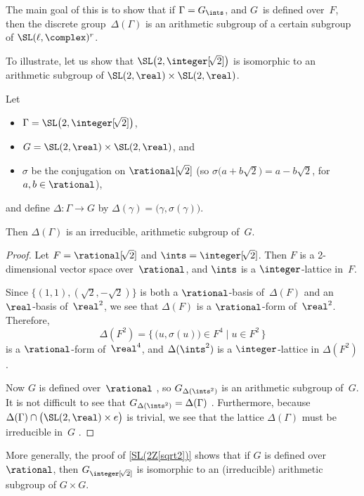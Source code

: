 The main goal of this  is to show that if $\Gamma = G_{\ints}$, and $G$~is defined
over~$F$, then the discrete group~$\Delta(\Gamma)$ is an arithmetic subgroup of a certain subgroup of
$\SL(\ell,\complex)^r$.

To illustrate, let us show that
$\SL \bigl( 2,\integer[\!\sqrt{2}] \bigr)$ is isomorphic to an
arithmetic subgroup of $\SL(2,\real) \times
\SL(2,\real)$.

\begin{eg} \label{SL(2Z[sqrt2])}
 Let
 \noprelistbreak
 \begin{itemize}
 \item $\Gamma = \SL \bigl( 2,\integer[\!\sqrt{2}] \bigr)$,
 \item $G = \SL(2, \real) \times \SL(2, \real)$, and
 \item $\sigma$ be the conjugation on $\rational[\!\sqrt{2}]$
\textup(so $\sigma \bigl( a + b \sqrt{2} \bigr) = a - b
\sqrt{2}$, for $a,b \in \rational$\textup),
 \end{itemize}
 and define $\Delta \colon \Gamma \to G$ by
$\Delta(\gamma) = \bigl(\gamma, \sigma(\gamma) \bigr)$.

Then $\Delta(\Gamma)$ is an irreducible, arithmetic subgroup
of~$G$.
 \end{eg}

\begin{proof}
 Let $F = \rational[\!\sqrt{2}]$ and $\ints =
\integer[\!\sqrt{2}]$. Then $F$ is a 2-dimensional vector
space over~$\rational$, and $\ints$ is a
$\integer$-lattice in~$F$.

Since $\bigl\{ (1,1) , (\sqrt{2},-\sqrt{2}) \bigr\}$ is both
a $\rational$-basis of~$\Delta(F)$ and an $\real$-basis
of~$\real^2$, we see that $\Delta(F)$ is a $\rational$-form
of~$\real^2$. Therefore,
 $$\Delta(F^2) = \bigl\{\, \bigl( u, \sigma(u) \bigr) \in F^4
\mid u \in F^2 \,\bigr\} $$
 is a $\rational$-form of~$\real^4$, and
$\Delta(\ints^2)$ is a $\integer$-lattice in
$\Delta(F^2)$.

Now $G$ is defined over~$\rational$ , so
$G_{\Delta(\ints^2)}$ is an arithmetic subgroup of~$G$.
It is not difficult to see that $G_{\Delta(\ints^2)} =
\Delta(\Gamma)$ . Furthermore,
because $\Delta(\Gamma) \cap \bigl( \SL(2,\real) \times e
\bigr)$ is trivial, we see that the lattice $\Delta(\Gamma)$
must be irreducible in~$G$ .
 \end{proof}

More generally, the proof of \cref{SL(2Z[sqrt2])}
shows that if $G$ is defined over~$\rational$, then
$G_{\integer[\!\sqrt{2}]}$ is isomorphic to an (irreducible)
arithmetic subgroup of $G \times G$. 

